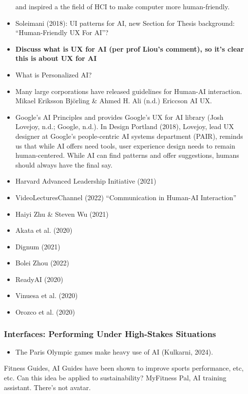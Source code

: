 \documentclass[
  letterpaper,
  DIV=11,
  numbers=noendperiod]{scrartcl}
\providecommand{\tightlist}{%
  \setlength{\itemsep}{0pt}\setlength{\parskip}{0pt}}\usepackage{longtable,booktabs,array}
\begin{document}
\begin{itemize}
  and inspired a the field of HCI to make computer more human-friendly.
\item
  Soleimani (2018): UI patterns for AI, new Section for Thesis
  background: ``Human-Friendly UX For AI''?
\item
  \textbf{Discuss what is UX for AI (per prof Liou's comment), so it's
  clear this is about UX for AI}
\item
  What is Personalized AI?
\item
  Many large corporations have released guidelines for Human-AI
  interaction. Mikael Eriksson Björling \& Ahmed H. Ali (n.d.) Ericcson
  AI UX.
\item
  Google's AI Principles and provides Google's UX for AI library (Josh
  Lovejoy, n.d.; Google, n.d.). In Design Portland (2018), Lovejoy, lead
  UX designer at Google's people-centric AI systems department (PAIR),
  reminds us that while AI offers need tools, user experience design
  needs to remain human-centered. While AI can find patterns and offer
  suggestions, humans should always have the final say.
\item
  Harvard Advanced Leadership Initiative (2021)
\item
  VideoLecturesChannel (2022) ``Communication in Human-AI Interaction''
\item
  Haiyi Zhu \& Steven Wu (2021)
\item
  Akata et al. (2020)
\item
  Dignum (2021)
\item
  Bolei Zhou (2022)
\item
  ReadyAI (2020)
\item
  Vinuesa et al. (2020)
\item
  Orozco et al. (2020)
\end{itemize}

\subsubsection{Interfaces: Performing Under High-Stakes
Situations}\label{interfaces-performing-under-high-stakes-situations}

\begin{itemize}
\tightlist
\item
  The Paris Olympic games make heavy use of AI (Kulkarni, 2024).
\end{itemize}

Fitness Guides, AI Guides have been shown to improve sports performance,
etc, etc. Can this idea be applied to sustainability? MyFitness Pal, AI
training assistant. There's not avatar.
\end{document}
